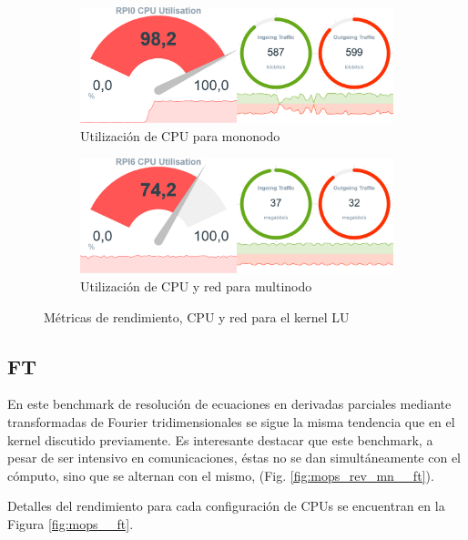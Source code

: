\begin{figure}[h!]
    \begin{subfigure}[c]{0.9\textwidth}
        \includegraphics[width=\textwidth]{img/benchmark_rev/lu_rev_sn.png}
        \caption{Utilización de CPU para mononodo}
        \label{fig:mops_rev_sn__lu}
    \end{subfigure}

    \vspace{0.5cm}
    
    \begin{subfigure}[c]{0.9\textwidth}
        \includegraphics[width=\textwidth]{img/benchmark_rev/lu_rev_mn.png}
        \caption{Utilización de CPU y red para multinodo}
        \label{fig:mops_rev_mn__lu}
    \end{subfigure}
    \caption{Métricas de rendimiento, CPU y red para el kernel LU}
    \label{fig:mops__lu}
\end{figure}

\subsection{FT}
\label{ssec:comparacion_resultados__ft}
En este benchmark de resolución de ecuaciones en derivadas parciales mediante transformadas de Fourier tridimensionales se sigue la misma tendencia que en el kernel discutido previamente. Es interesante destacar que este benchmark, a pesar de ser intensivo en comunicaciones, éstas no se dan simultáneamente con el cómputo, sino que se alternan con el mismo, (Fig. \ref{fig:mops_rev_mn__ft}).

Detalles del rendimiento para cada configuración de CPUs se encuentran en la Figura \ref{fig:mops__ft}.

